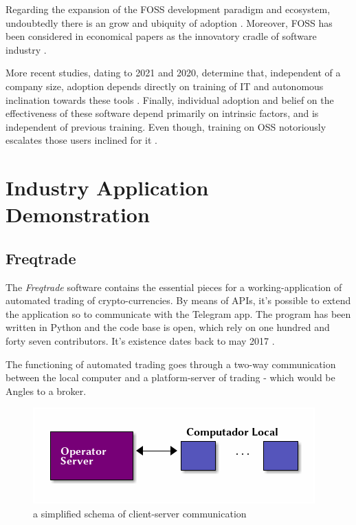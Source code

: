 \documentclass[
12pt,				%
openright,			%
oneside,			%
a4paper,			%
brazil,				%
english,			%
]{abntex2}
\begin{document}
Regarding the expansion of the FOSS development paradigm and
ecosystem, undoubtedly there is an grow and ubiquity of adoption
\cite{schmidt2016agile}. Moreover, FOSS has been considered in
economical papers as the innovatory cradle of software industry \cite{schrape2019open,schmidt2016agile}.

More recent studies, dating to 2021 and 2020, determine that,
independent of a company size, adoption depends directly on training
of IT and autonomous inclination towards these tools
\cite{racero2020predicting}. Finally, individual adoption and belief
on the effectiveness of these software depend primarily on intrinsic
factors, and is independent of previous training. Even though,
training on OSS notoriously escalates those users inclined for it \cite{racero2021can}.       

\section{Industry Application Demonstration}
\subsection{Freqtrade}
The \emph{Freqtrade} software contains the essential pieces for a
working-application of automated trading of crypto-currencies. By
means of APIs, it's possible to extend the application so to
communicate with the Telegram app. The program has been written in
Python and the code base is open, which rely on one hundred and
forty seven contributors. It's existence dates back to may 2017 \cite{fang2020cryptocurrency}.



The functioning of automated trading goes through a two-way
communication between the local computer and a platform-server of
trading - which would be Angles to a broker.

\begin{figure}[ht]
  \centering
    \caption{\label{fig:diagrama-freqtrade} a simplified schema of
      client-server communication}
  \includegraphics[width=0.6\linewidth]{Imagens/server-client-fq_4.png}
\end{figure}
\end{document}
